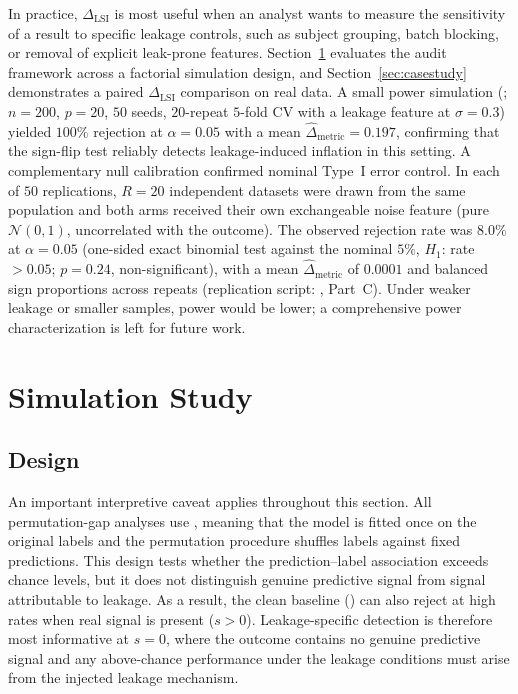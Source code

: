 \documentclass[article,shortnames]{jss}
\begin{document}
\noindent
In practice, $\Delta_{\mathrm{LSI}}$ is most useful when an analyst wants to
measure the sensitivity of a result to specific leakage controls, such as
subject grouping, batch blocking, or removal of explicit leak-prone features.
Section~\ref{sec:simulation} evaluates the audit framework across a factorial
simulation design, and Section~\ref{sec:casestudy} demonstrates a paired
$\Delta_{\mathrm{LSI}}$ comparison on real data. A small power simulation
(; $n = 200$, $p = 20$, $50$ seeds, $20$-repeat
$5$-fold CV with a  leakage feature at $\sigma = 0.3$)
yielded $100\%$ rejection at $\alpha = 0.05$ with a mean
$\widehat{\Delta}_{\mathrm{metric}} = 0.197$, confirming that the sign-flip
test reliably detects leakage-induced inflation in this setting.
A complementary null calibration confirmed nominal Type~I error control.
In each of $50$ replications, $R = 20$ independent datasets were drawn from
the same population and both arms received their own exchangeable noise
feature (pure $\mathcal{N}(0,1)$, uncorrelated with the outcome). The
observed rejection rate was $8.0\%$ at $\alpha = 0.05$ (one-sided exact
binomial test against the nominal $5\%$, $H_1$: rate $> 0.05$; $p = 0.24$,
non-significant), with a mean
$\widehat{\Delta}_{\mathrm{metric}}$ of $0.0001$ and balanced sign
proportions across repeats (replication script: ,
Part~C).
Under weaker leakage or smaller samples, power would be lower; a
comprehensive power characterization is left for future work.

\section{Simulation Study}\label{sec:simulation}

\subsection{Design}

An important interpretive caveat applies throughout this section. All
permutation-gap analyses use , meaning that the
model is fitted once on the original labels and the permutation procedure
shuffles labels against fixed predictions. This design tests whether the
prediction--label association exceeds chance levels, but it does not
distinguish genuine predictive signal from signal attributable to leakage. As a
result, the clean baseline () can also reject at high rates when
real signal is present ($s > 0$). Leakage-specific detection is therefore most
informative at $s = 0$, where the outcome contains no genuine predictive signal
and any above-chance performance under the leakage conditions must arise from
the injected leakage mechanism.
\end{document}
